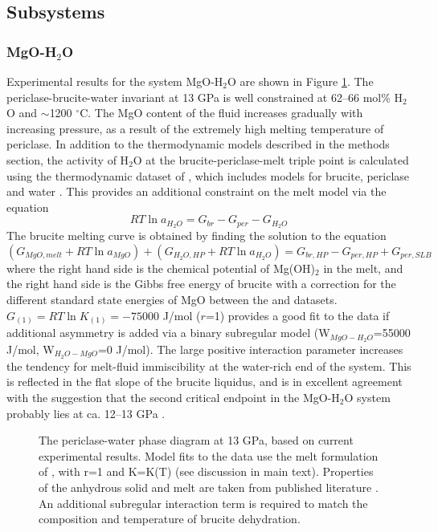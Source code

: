 \documentclass[review]{elsarticle}
\begin{document}
\subsection{Subsystems}
\subsubsection{MgO-H$_2$O}
Experimental results for the system MgO-H$_2$O are shown in Figure \ref{fig:MH}. The periclase-brucite-water invariant at 13 GPa is well constrained at 62--66 mol\% H$_2$O and $\sim$1200 $^{\circ}$C. The MgO content of the fluid increases gradually with increasing pressure, as a result of the extremely high melting temperature of periclase. In addition to the thermodynamic models described in the methods section, the activity of H$_2$O at the brucite-periclase-melt triple point is calculated using the thermodynamic dataset of \citep{HP2011}, which includes models for brucite, periclase and water \citep{PS1995}. This provides an additional constraint on the melt model via the equation
\begin{equation}
RT \ln a_{H_2O} =  G_{br} - G_{per} - G_{H_2O}
\end{equation}
The brucite melting curve is obtained by finding the solution to the equation
\begin{equation}
(G_{MgO, melt} + RT \ln a_{MgO}) + (G_{H_2O, HP} + RT \ln a_{H_2O}) = G_{br, HP} - G_{per, HP} + G_{per, SLB}
\end{equation}
\noindent where the right hand side is the chemical potential of Mg(OH)$_2$ in the melt, and the right hand side is the Gibbs free energy of brucite with a correction for the different standard state energies of MgO between the \cite{HP2011} and \cite{SLB2011} datasets. $G_{(1)} = RT \ln K_{(1)} = -75000$ J/mol ($r$=1) provides a good fit to the data if additional asymmetry is added via a binary subregular model (W$_{MgO-H_2O}$=55000 J/mol, W$_{H_2O-MgO}$=0 J/mol). The large positive interaction parameter increases the tendency for melt-fluid immiscibility at the water-rich end of the system. This is reflected in the flat slope of the brucite liquidus, and is in excellent agreement with the suggestion that the second critical endpoint in the MgO-H$_2$O system probably lies at ca. 12--13 GPa \citep{MSUP2007}.

\begin{figure}[ht!]
  \centering
  \caption{The periclase-water phase diagram at 13 GPa, based on current experimental results. Model fits to the data use the melt formulation of \cite{SS1985}, with r=1 and K=K(T) (see discussion in main text). Properties of the anhydrous solid and melt are taken from published literature \citep{SLB2011, DKS2013}. An additional subregular interaction term is required to match the composition and temperature of brucite dehydration.}
  \label{fig:MH}
\end{figure}
\end{document}
